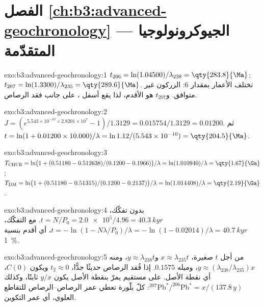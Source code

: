 \section*{الفصل \ref{ch:b3:advanced-geochronology} --- الجيوكرونولوجيا المتقدّمة}

\begin{solution}{exo:b3:advanced-geochronology:1}
$t_{206} = \ln(1.04500)/\lambda_{238} = \qty{283.8}{\Ma}$; $t_{207} =
\ln(1.3300)/\lambda_{235} = \qty{289.6}{\Ma}$. تختلف الأعمار بمقدار
\qty{6}{\Ma}: الزركون غير متوافق. و$t_{207}$ هو الأقدم، لذا يقع
أسفل ، على جانب فقد الرصاص.
\end{solution}

\begin{solution}{exo:b3:advanced-geochronology:2}
$J = (e^{5.543\times10^{-10}\times2.8201\times10^7} - 1)/1.3129 =
0.015754/1.3129 = 0.01200$. ثم $t = \ln(1 + 0.01200\times10.000)/\lambda =
\ln 1.12/(5.543\times10^{-10}) = \qty{204.5}{\Ma}$.
\end{solution}

\begin{solution}{exo:b3:advanced-geochronology:3}
$T_{\mathrm{CHUR}} = \ln\bigl(1 + (0.51180 - 0.512638)/(0.1200 -
0.1966)\bigr)/\lambda = \ln(1.010940)/\lambda = \qty{1.67}{\Ga}$;
$T_{\mathrm{DM}} = \ln\bigl(1 + (0.51180 - 0.51315)/(0.1200 - 0.2137)\bigr)/\lambda
= \ln(1.014408)/\lambda = \qty{2.19}{\Ga}$.
\end{solution}

\begin{solution}{exo:b3:advanced-geochronology:4}
بدون تفكّك، $t = N/P_0 = \num{2.0e5}/4.96 = \qty{40.3}{kyr}$. مع التفكّك،
$t = -\ln(1 - N\lambda/P_0)/\lambda = -\ln(1 - 0.02014)/\lambda =
\qty{40.7}{kyr}$، أي أقدم بنسبة \qty{1}{\percent}.
\end{solution}

\begin{solution}{exo:b3:advanced-geochronology:5}
من أجل $t$ صغيرة، $x \approx \lambda_{235}t$ و$y \approx \lambda_{238}t$، ومنه
$y \approx (\lambda_{238}/\lambda_{235})x$، وميله $0.1575$. إذا فُقد الرصاص
حديثًا جدًّا، $t_2 \approx 0$ ويكون  $C(0)$، أي
نقطة الأصل. على مستقيم يمرّ بنقطة الأصل يكون $y/x$ ثابتًا، وكذلك
$^{207}\mathrm{Pb}^*/^{206}\mathrm{Pb}^* = x/(137.8\,y)$: كلّ بلّورة تعطي
عمر الرصاص--الرصاص للتقاطع العلوي، أي عمر التكوين.
\end{solution}


